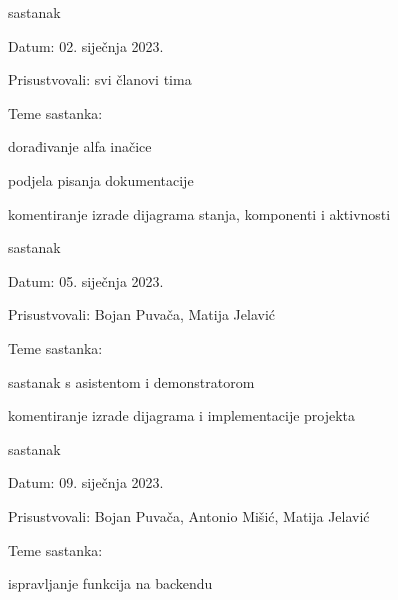 \begin{packed_enum}
                \item  sastanak
			\item[] \begin{packed_item}
				\item Datum: 02. siječnja 2023.
				\item Prisustvovali: svi članovi tima
				\item Teme sastanka:
				\begin{packed_item} 
                        \item  dorađivanje alfa inačice
                        \item  podjela pisanja dokumentacije
                        \item  komentiranje izrade dijagrama stanja, komponenti i aktivnosti
				\end{packed_item}
			\end{packed_item}

                \item  sastanak
			\item[] \begin{packed_item}
				\item Datum: 05. siječnja 2023.
				\item Prisustvovali: Bojan Puvača, Matija Jelavić
				\item Teme sastanka:
				\begin{packed_item} 
                        \item  sastanak s asistentom i demonstratorom
                        \item  komentiranje izrade dijagrama i implementacije projekta
				\end{packed_item}
			\end{packed_item}

                \item  sastanak
			\item[] \begin{packed_item}
				\item Datum: 09. siječnja 2023.
				\item Prisustvovali: Bojan Puvača, Antonio Mišić, Matija Jelavić
				\item Teme sastanka:
				\begin{packed_item} 
                        \item  ispravljanje funkcija na backendu
				\end{packed_item}
			\end{packed_item}


\end{packed_enum}
